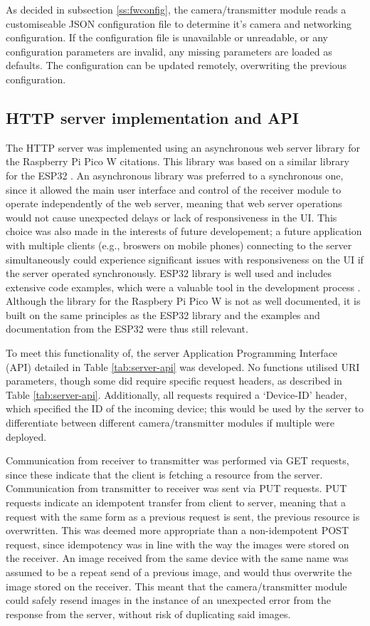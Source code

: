 \documentclass[class=report,11pt,crop=false]{standalone}
\begin{document}
As decided in subsection \ref{ss:fwconfig}, the camera/transmitter module reads a customiseable JSON configuration file to determine it's camera and networking configuration. If the configuration file is unavailable or unreadable, or any configuration parameters are invalid, any missing parameters are loaded as defaults. The configuration can be updated remotely, overwriting the previous configuration.

\subsection{HTTP server implementation and API}

The HTTP server was implemented using an asynchronous web server library for the Raspberry Pi Pico W citations\cite{hoang2023async}. This library was based on a similar library for the ESP32 \cite{gochkov2023async}. An asynchronous library was preferred to a synchronous one, since it allowed the main user interface and control of the receiver module to operate independently of the web server, meaning that web server operations would not cause unexpected delays or lack of responsiveness in the UI. This choice was also made in the interests of future developement; a future application with multiple clients (e.g., broswers on mobile phones) connecting to the server simultaneously could experience significant issues with responsiveness on the UI if the server operated synchronously. ESP32 library is well used and includes extensive code examples, which were a valuable tool in the development process  \cite{hoang2023async}. Although the library for the Raspbery Pi Pico W is not as well documented, it is built on the same principles as the ESP32 library and the examples and documentation from the ESP32 were thus still relevant.

To meet this functionality of, the server Application Programming Interface (API) detailed in Table \ref{tab:server-api} was developed. No functions utilised URI parameters, though some did require specific request headers, as described in Table \ref{tab:server-api}. Additionally, all requests required a `Device-ID' header, which specified the ID of the incoming device; this would be used by the server to differentiate between different camera/transmitter modules if multiple were deployed.

Communication from receiver to transmitter was performed via GET requests, since these indicate that the client is fetching a resource from the server. Communication from transmitter to receiver was sent via PUT requests. PUT requests indicate an idempotent transfer from client to server, meaning that a request with the same form as a previous request is sent, the previous resource is overwritten. This was deemed more appropriate than a non-idempotent POST request, since idempotency was in line with the way the images were stored on the receiver. An image received from the same device with the same name was assumed to be a repeat send of a previous image, and would thus overwrite the image stored on the receiver. This meant that the camera/transmitter module could safely resend images in the instance of an unexpected error from the response from the server, without risk of duplicating said images.
\end{document}

